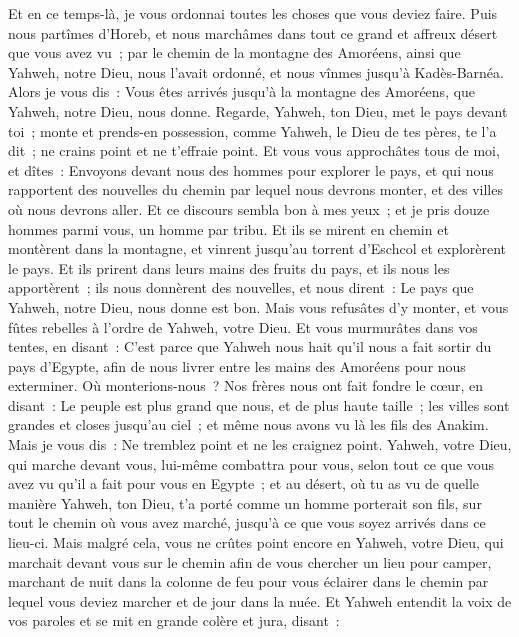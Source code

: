 \begin{multicols}{2}
Et en ce temps-là, je vous ordonnai toutes les choses que vous deviez faire.
Puis nous partîmes d'Horeb, et nous marchâmes dans tout ce grand et affreux désert que vous avez vu~; par le chemin de la montagne des Amoréens, ainsi que Yahweh, notre Dieu, nous l'avait ordonné, et nous vînmes jusqu'à Kadès-Barnéa.
Alors je vous dis~: Vous êtes arrivés jusqu'à la montagne des Amoréens, que Yahweh, notre Dieu, nous donne.
Regarde, Yahweh, ton Dieu, met le pays devant toi~; monte et prends-en possession, comme Yahweh, le Dieu de tes pères, te l'a dit~; ne crains point et ne t'effraie point.
Et vous vous approchâtes tous de moi, et dîtes~: Envoyons devant nous des hommes pour explorer le pays, et qui nous rapportent des nouvelles du chemin par lequel nous devrons monter, et des villes où nous devrons aller.
Et ce discours sembla bon à mes yeux~; et je pris douze hommes parmi vous, un homme par tribu.
Et ils se mirent en chemin et montèrent dans la montagne, et vinrent jusqu'au torrent d'Eschcol et explorèrent le pays.
Et ils prirent dans leurs mains des fruits du pays, et ils nous les apportèrent~; ils nous donnèrent des nouvelles, et nous dirent~: Le pays que Yahweh, notre Dieu, nous donne est bon.
Mais vous refusâtes d'y monter, et vous fûtes rebelles à l'ordre de Yahweh, votre Dieu.
Et vous murmurâtes dans vos tentes, en disant~: C'est parce que Yahweh nous hait qu'il nous a fait sortir du pays d'Egypte, afin de nous livrer entre les mains des Amoréens pour nous exterminer.
Où monterions-nous~? Nos frères nous ont fait fondre le cœur, en disant~: Le peuple est plus grand que nous, et de plus haute taille~; les villes sont grandes et closes jusqu'au ciel~; et même nous avons vu là les fils des Anakim.
Mais je vous dis~: Ne tremblez point et ne les craignez point.
Yahweh, votre Dieu, qui marche devant vous, lui-même combattra pour vous, selon tout ce que vous avez vu qu'il a fait pour vous en Egypte~;
et au désert, où tu as vu de quelle manière Yahweh, ton Dieu, t'a porté comme un homme porterait son fils, sur tout le chemin où vous avez marché, jusqu'à ce que vous soyez arrivés dans ce lieu-ci.
Mais malgré cela, vous ne crûtes point encore en Yahweh, votre Dieu,
qui marchait devant vous sur le chemin afin de vous chercher un lieu pour camper, marchant de nuit dans la colonne de feu pour vous éclairer dans le chemin par lequel vous deviez marcher et de jour dans la nuée.
Et Yahweh entendit la voix de vos paroles et se mit en grande colère et jura, disant~:

\end{multicols}
